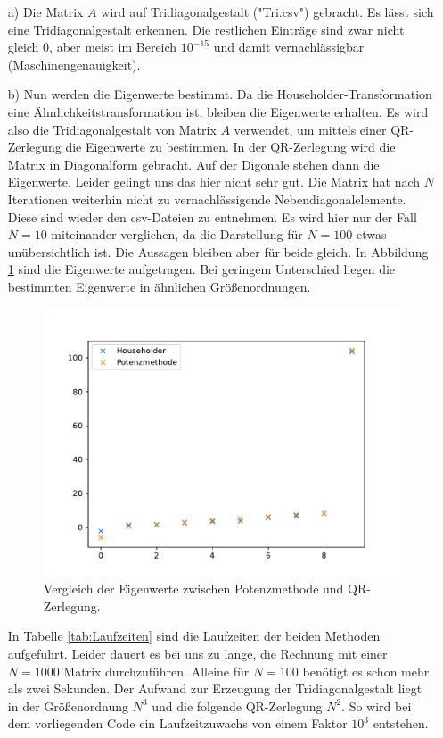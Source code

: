 \begin{itemize}
    \item[a)]
    Die Matrix $A$ wird auf Tridiagonalgestalt ("Tri.csv") gebracht. Es lässt sich eine Tridiagonalgestalt erkennen. 
    Die restlichen Einträge sind zwar nicht gleich $0$, aber meist im Bereich $10^{-15}$ und damit vernachlässigbar (Maschinengenauigkeit).

    

    \item[b)]
    Nun werden die Eigenwerte bestimmt. Da die Householder-Transformation eine Ähnlichkeitstransformation ist, bleiben die Eigenwerte erhalten.
    Es wird also die Tridiagonalgestalt von Matrix $A$ verwendet, um mittels einer QR-Zerlegung die Eigenwerte zu bestimmen.
    In der QR-Zerlegung wird die Matrix in Diagonalform gebracht. Auf der Digonale stehen dann die Eigenwerte.
    Leider gelingt uns das hier nicht sehr gut. Die Matrix hat nach $N$ Iterationen weiterhin nicht zu vernachlässigende Nebendiagonalelemente.
    Diese sind wieder den csv-Dateien zu entnehmen.
    Es wird hier nur der Fall $N=10$ miteinander verglichen, da die Darstellung für $N=100$ etwas unübersichtlich ist. Die Aussagen bleiben aber für beide gleich.
    In Abbildung \ref{fig:vergleich} sind die Eigenwerte aufgetragen. Bei geringem Unterschied liegen die bestimmten Eigenwerte in ähnlichen Größenordnungen.

    \begin{figure}
        \centering
        \includegraphics[width=.8\textwidth]{images/Ev_vergleich.pdf}
        \caption{Vergleich der Eigenwerte zwischen Potenzmethode und QR-Zerlegung.}
        \label{fig:vergleich}
    \end{figure}

    In Tabelle \ref{tab:Laufzeiten} sind die Laufzeiten der beiden Methoden aufgeführt.
    Leider dauert es bei uns zu lange, die Rechnung mit einer $N=1000$ Matrix durchzuführen. Alleine für $N=100$ benötigt es schon mehr als zwei Sekunden.
    Der Aufwand zur Erzeugung der Tridiagonalgestalt liegt in der Größenordnung $N^3$ und die folgende QR-Zerlegung $N^2$.
     So wird bei dem vorliegenden Code ein Laufzeitzuwachs von einem Faktor $10^3$ entstehen.


\end{itemize}
